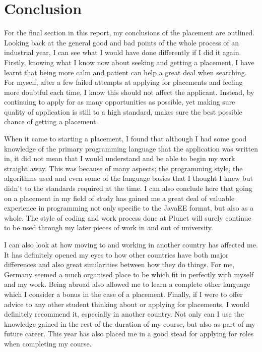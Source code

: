 \documentclass[12pt]{article}
\begin{document}
\section{Conclusion}
For the final section in this report, my conclusions of the placement are outlined. Looking back at the general good and bad points of the whole
process of an industrial year, I can see what I would have done differently if I did it again. Firstly, knowing what I know now about seeking and
getting a placement, I have learnt that being more calm and patient can help a great deal when searching. For myself, after a few failed attempts at
applying for placements and feeling more doubtful each time, I know this should not affect the applicant. Instead, by continuing to apply for as many
opportunities as possible, yet making sure quality of application is still to a high standard, makes sure the best possible chance of getting a
placement.\\ \par \noindent
When it came to starting a placement, I found that although I had some good knowledge of the primary programming language that the application was
written in, it did not mean that I would understand and be able to begin my work straight away. This was because of many aspects; the programming
style, the algorithms used and even some of the language basics that I thought I knew but didn’t to the standards required at the time. I can also
conclude here that going on a placement in my field of study has gained me a great deal of valuable experience in programming not only specific to the
JavaEE format, but also as a whole. The style of coding and work process done at Plunet will surely continue to be used through my later pieces of
work in and out of university.\\ \par \noindent
I can also look at how moving to and working in another country has affected me. It has definitely opened my eyes to how other countries have both
major differences and also great similarities between how they do things. For me, Germany seemed a much organised place to be which fit in perfectly
with myself and my work. Being abroad also allowed me to learn a complete other language which I consider a bonus in the case of a placement.
Finally, if I were to offer advice to any other student thinking about or applying for placements, I would definitely recommend it, especially in
another country. Not only can I use the knowledge gained in the rest of the duration of my course, but also as part of my future career. This year has
also placed me in a good stead for applying for roles when completing my course.
\end{document}
